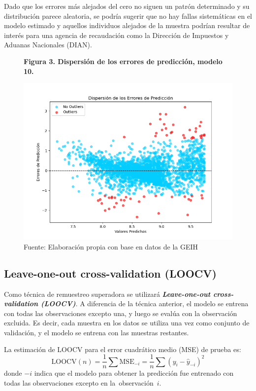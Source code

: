 \documentclass[11pt, a4paper]{article}
\begin{document}
Dado que los errores más alejados del cero no siguen un patrón determinado y su distribución parece aleatoria, se podría sugerir que no hay fallas sistemáticas en el modelo estimado y aquellos individuos alejados de la muestra podrían resultar de interés para una agencia de recaudación como la Dirección de Impuestos y Aduanas Nacionales (DIAN).
\begin{figure}[H]
    \centering
	\caption*{\textbf{Figura 3. Dispersión de los errores de predicción, modelo 10.}}
	\captionsetup{justification=centering}
	\includegraphics[width=16cm]{../Views/grafico4.png}
	\caption*{\small Fuente: Elaboración propia con base en datos de la GEIH }
\end{figure}

\subsection{Leave-one-out cross-validation (LOOCV)}
Como técnica de remuestreo superadora se utilizará \textbf{\textit{Leave-one-out cross-validation (LOOCV)}}. A diferencia de la técnica anterior,  el modelo se entrena con todas las observaciones excepto una, y luego se evalúa con la observación excluida. Es decir, cada muestra en los datos se utiliza una vez como conjunto de validación, y el modelo se entrena con las muestras restantes. 

La estimación de LOOCV para el error cuadrático medio (MSE) de prueba es:
\begin{equation*}
\text{LOOCV}(n) = \frac{1}{n} \sum \text{MSE}_{-i} 
= \frac{1}{n} \sum (y_i - \hat{y}_{-i})^2
\end{equation*}
donde $-i$ indica que el modelo para obtener la predicción fue entrenado con todas las observaciones excepto en la observación $i$.
\end{document}
